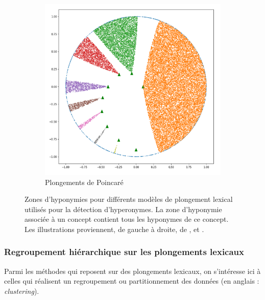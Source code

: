 \begin{figure}[h]
\begin{subfigure}{.33\textwidth}
    \end{subfigure}
    \begin{subfigure}{.33\textwidth}
          \centering
          \includegraphics[width=.8\linewidth]{img/emb-poincone.png}  
          \caption{Plongements de Poincaré}
          \label{subfig:poincone}
    \end{subfigure}
    \caption[Plongements lexicaux spécifiques à l'hyperonymie]{Zones d'hyponymies pour  différents modèles de plongement lexical utilisés pour la détection d'hyperonymes. La zone d'hyponymie associée à un concept contient tous les hyponymes de ce concept. Les illustrations proviennent, de gauche à droite, de \cite{vendrov2015order}, \cite{vilnis2018probabilistic} et \cite{ganea2018hyperbolic}.}
    \label{fig:litt-emb-models}
\end{figure}


\subsubsection{Regroupement hiérarchique sur les plongements lexicaux}

Parmi les méthodes qui reposent sur des plongements lexicaux, on s'intéresse ici à celles qui réalisent un regroupement ou partitionnement des données (en anglais : \textit{clustering}).

